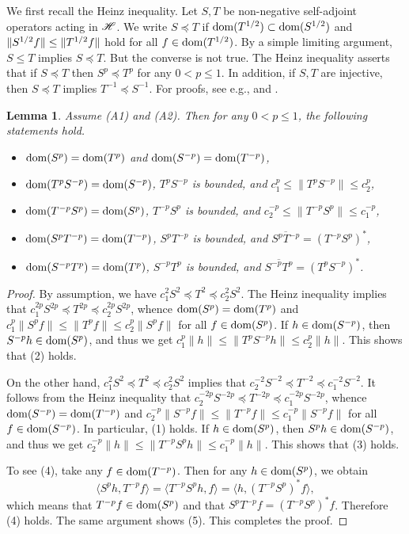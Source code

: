 \documentclass[12pt]{article}
\theoremstyle{plain}
\newtheorem{lem}[theorem]{\bf Lemma}
\numberwithin{equation}{section}
\theoremstyle{remark}
\begin{document}
We first recall the Heinz inequality. 
Let $S, T$ be non-negative self-adjoint operators acting in $\mathscr{H}$.
We write $S \preceq T$ if $\mathop{\mathrm{dom}}(T^{1/2}) \subset \mathop{\mathrm{dom}}(S^{1/2})$ and $\| S^{1/2}f \| \leq \| T^{1/2}f \|$ hold for all $f \in \mathop{\mathrm{dom}}(T^{1/2})$.
By a simple limiting argument, $S \leq T$ implies $S \preceq T$.
But the converse is not true. The Heinz inequality asserts that if $S \preceq T$ then $S^p \preceq T^p$ for any $0 < p \leq 1$.
In addition, if $S, T$ are injective, then $S \preceq T$ implies $T^{-1} \preceq S^{-1}$. 
For proofs, see e.g., \cite[Proposition 10.14]{Sc12} and \cite[Corollary 10.12]{Sc12}.


\begin{lem}\label{bounded}
Assume (A1) and (A2).
Then for any $0<p\leq1$, the following statements hold.
\begin{itemize}
\item[(1)] $\mathop{\mathrm{dom}}(S^p)=\mathop{\mathrm{dom}}(T^p)$ and $\mathop{\mathrm{dom}}(S^{-p})=\mathop{\mathrm{dom}}(T^{-p})$,
\item[(2)] $\mathop{\mathrm{dom}}(T^pS^{-p})=\mathop{\mathrm{dom}}(S^{-p})$, $T^pS^{-p}$ is bounded, and $c_1^p\leq\|T^pS^{-p}\|\leq c_2^p$,
\item[(3)] $\mathop{\mathrm{dom}}(T^{-p}S^p)=\mathop{\mathrm{dom}}(S^p)$, $T^{-p}S^p$ is bounded, and $c_2^{-p}\leq\|T^{-p}S^p\|\leq c_1^{-p}$,
\item[(4)] $\mathop{\mathrm{dom}}(S^pT^{-p})=\mathop{\mathrm{dom}}(T^{-p})$, $S^pT^{-p}$ is bounded, and $\overline{S^pT^{-p}}=\left(T^{-p}S^p\right)^*$,
\item[(5)] $\mathop{\mathrm{dom}}(S^{-p}T^p)=\mathop{\mathrm{dom}}(T^p)$, $S^{-p}T^p$ is bounded, and $\overline{S^{-p}T^p}=\left(T^pS^{-p}\right)^*$.
\end{itemize}
\end{lem}

\begin{proof}
By assumption, we have $c_1^2 S^2 \preceq T^2 \preceq c_2^2 S^2$. 
The Heinz inequality implies that $c_1^{2p}S^{2p} \preceq T^{2p} \preceq c_2^{2p}S^{2p}$, 
whence  $\mathop{\mathrm{dom}}(S^p)=\mathop{\mathrm{dom}}(T^p)$ and 
$c_1^p\|S^pf\|\leq\|T^pf\|\leq c_2^p\|S^pf\|$ for all $f\in\mathop{\mathrm{dom}}(S^p)$.
If $h\in\mathop{\mathrm{dom}}(S^{-p})$, then $S^{-p}h\in\mathop{\mathrm{dom}}(S^p)$, and thus we get $c_1^p\|h\|\leq\|T^pS^{-p}h\|\leq c_2^p\|h\|$.
This shows that (2) holds.

On the other hand, $c_1^2S^2\preceq T^2\preceq c_2^2S^2$ implies that $c_2^{-2}S^{-2}\preceq T^{-2}\preceq c_1^{-2}S^{-2}$.
It follows from the Heinz inequality that $c_2^{-2p}S^{-2p}\preceq T^{-2p}\preceq c_1^{-2p}S^{-2p}$, 
whence $\mathop{\mathrm{dom}}(S^{-p})=\mathop{\mathrm{dom}}(T^{-p})$ and $c_2^{-p}\|S^{-p}f\|\leq\|T^{-p}f\|\leq c_1^{-p}\|S^{-p}f\|$ for all $f\in\mathop{\mathrm{dom}}(S^{-p})$.
In particular, (1) holds.
If $h\in\mathop{\mathrm{dom}}(S^p )$, then $S^p h\in\mathop{\mathrm{dom}}(S^{-p})$, and thus we get $c_2^{-p}\|h\|\leq\|T^{-p}S^p h\|\leq c_1^{-p}\|h\|$.
This shows that (3) holds.

To see (4), take any $f\in\mathop{\mathrm{dom}}(T^{-p})$.
Then for any $h\in\mathop{\mathrm{dom}}(S^p )$, we obtain
\[
  \langle S^p h, T^{-p}f\rangle = \langle T^{-p}S^p h, f\rangle = \langle h, \left(T^{-p}S^p \right)^*f\rangle,
\]
which means that $T^{-p}f\in\mathop{\mathrm{dom}}(S^p )$ and that $S^p T^{-p}f = (T^{-p}S^p)^*f$.
Therefore (4) holds.
The same argument shows (5).
This completes the proof.
\end{proof}
\end{document}
